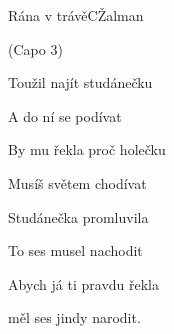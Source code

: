 \begin{song}{Rána v trávě}{C}{Žalman}

(Capo 3)
\begin{SBChorus}



\end{SBChorus}
\begin{SBVerse}



\end{SBVerse}
\begin{SBVerse}
Toužil najít studánečku

A do ní se podívat

By mu řekla proč holečku

Musíš světem chodívat
\end{SBVerse}
\begin{SBVerse}
Studánečka promluvila

To ses musel nachodit

Abych já ti pravdu řekla

měl ses jindy narodit.
\end{SBVerse}
\end{song}

\pagebreak